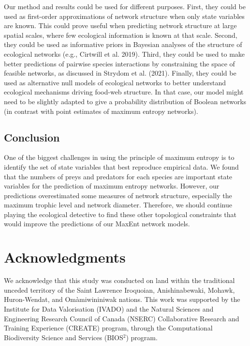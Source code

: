 \documentclass[10pt,oneside]{article}
\begin{document}
Our method and results could be used for different purposes. First, they
could be used as first-order approximations of network structure when
only state variables are known. This could prove useful when predicting
network structure at large spatial scales, where few ecological
information is known at that scale. Second, they could be used as
informative priors in Bayesian analyses of the structure of ecological
networks (e.g., Cirtwill et al. 2019). Third, they could be used to make
better predictions of pairwise species interactions by constraining the
space of feasible networks, as discussed in Strydom et al. (2021).
Finally, they could be used as alternative null models of ecological
networks to better understand ecological mechanisms driving food-web
structure. In that case, our model might need to be slightly adapted to
give a probability distribution of Boolean networks (in contrast with
point estimates of maximum entropy networks).

\hypertarget{conclusion}{%
\subsection{Conclusion}\label{conclusion}}

One of the biggest challenges in using the principle of maximum entropy
is to identify the set of state variables that best reproduce empirical
data. We found that the numbers of preys and predators for each species
are important state variables for the prediction of maximum entropy
networks. However, our predictions overestimated some measures of
network structure, especially the maximum trophic level and network
diameter. Therefore, we should continue playing the ecological detective
to find these other topological constraints that would improve the
predictions of our MaxEnt network models.

\hypertarget{acknowledgments}{%
\section{Acknowledgments}\label{acknowledgments}}

We acknowledge that this study was conducted on land within the
traditional unceded territory of the Saint Lawrence Iroquoian,
Anishinabewaki, Mohawk, Huron-Wendat, and Omàmiwininiwak nations. This
work was supported by the Institute for Data Valorisation (IVADO) and
the Natural Sciences and Engineering Research Council of Canada (NSERC)
Collaborative Research and Training Experience (CREATE) program, through
the Computational Biodiversity Science and Services (BIOS\(^2\))
program.
\end{document}
